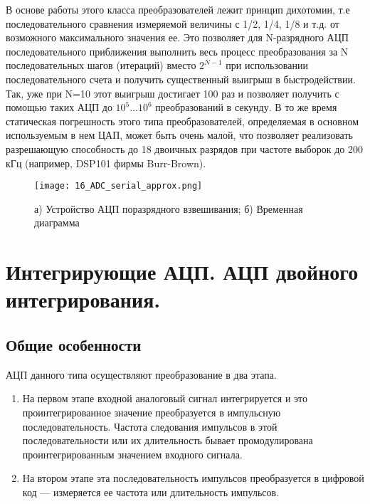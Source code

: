 В основе работы этого класса преобразователей лежит принцип дихотомии, т.е последовательного сравнения измеряемой величины с 1/2, 1/4, 1/8 и т.д. от возможного максимального значения ее. Это позволяет для N-разрядного АЦП последовательного приближения выполнить весь процесс преобразования за N последовательных шагов (итераций) вместо $2^{N-1}$ при использовании последовательного счета и получить существенный выигрыш в быстродействии. Так, уже при N=10 этот выигрыш достигает 100 раз и позволяет получить с помощью таких АЦП до $10^5$...$10^6$ преобразований в секунду. В то же время статическая погрешность этого типа преобразователей, определяемая в основном используемым в нем ЦАП, может быть очень малой, что позволяет реализовать разрешающую способность до 18 двоичных разрядов при частоте выборок до 200 кГц (например, DSP101 фирмы Burr-Brown).

\begin{figure}[H]
\centering
\texttt{[image: 16\_ADC\_serial\_approx.png]}
\caption{а) Устройство АЦП поразрядного взвешивания; б) Временная диаграмма}
\label{fig:16_ADC_serial_approx}
\end{figure}


\section{Интегрирующие АЦП. АЦП двойного интегрирования.}

\subsection*{Общие особенности}

АЦП данного типа осуществляют преобразование в два этапа.

\begin{enumerate}
\item На первом этапе входной аналоговый сигнал интегрируется и это проинтегрированное значение преобразуется в импульсную последовательность. Частота следования импульсов в этой последовательности или их длительность бывает промодулирована проинтегрированным значением входного сигнала.
\item На втором этапе эта последовательность импульсов преобразуется в цифровой код --- измеряется ее частота или длительность импульсов.
\end{enumerate}

